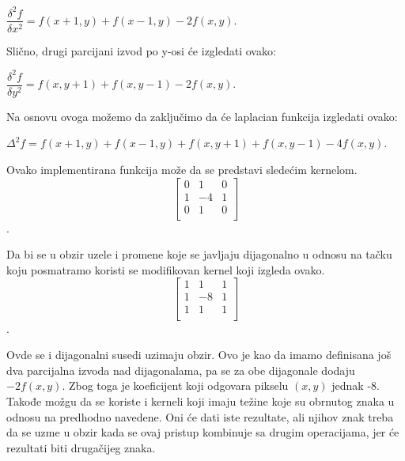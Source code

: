 \documentclass[a4paper,12pt,titlepage]{article}
\begin{document}
\begin{center}
$\dfrac{\delta^{2}f}{\delta x^{2}} = f(x + 1, y) + f(x - 1, y) - 2f(x, y)$.\\
\end{center}

Slično, drugi parcijani izvod po y-osi će izgledati ovako:

\begin{center}
$\dfrac{\delta^{2}f}{\delta y^{2}} = f(x, y + 1) + f(x, y - 1) - 2f(x, y)$.\\  
\end{center}

Na osnovu ovoga možemo da zaključimo da će laplacian funkcija izgledati ovako:

\begin{center}
$\Delta^{2}f = f(x + 1, y) + f(x - 1, y) + f(x, y + 1) + f(x, y - 1) - 4f(x, y)$. \\
\end{center}

Ovako implementirana funkcija može da se predstavi sledećim kernelom.\\

\[
\begin{bmatrix}
     0 & 1 & 0 \\
     1 & -4 & 1 \\
     0 & 1 & 0 \\
\end{bmatrix}
\]. 

Da bi se u obzir uzele i promene koje se javljaju dijagonalno u odnosu na tačku koju posmatramo koristi se modifikovan kernel koji izgleda ovako.\\

\[
\begin{bmatrix}
     1 & 1 & 1 \\
     1 & -8 & 1 \\
     1 & 1 & 1 \\
\end{bmatrix}
\].

Ovde se i dijagonalni susedi uzimaju obzir. Ovo je kao da imamo definisana još dva parcijalna izvoda nad dijagonalama, pa se za obe dijagonale dodaju $-2f(x, y)$. Zbog toga je koeficijent koji odgovara pikselu $(x, y)$ jednak -8. Takođe možgu da se koriste i kerneli koji imaju težine koje su obrnutog znaka u odnosu na predhodno navedene. Oni će dati iste rezultate, ali njihov znak treba da se uzme u obzir kada se ovaj pristup kombinuje sa drugim operacijama, jer će rezultati biti drugačijeg znaka. \\
\end{document}
